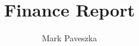 \documentclass[]{report}
\title{Finance Report}
\author{Mark Paveszka}
\begin{document}
\maketitle

\begin{abstract}
\end{abstract}
\end{document}
